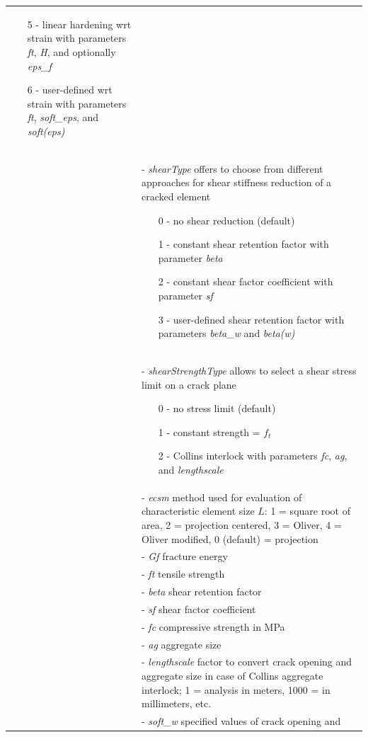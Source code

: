 \documentclass[a4paper]{article}
\newcommand{\param}[1]{{\it #1}}
\begin{document}
\begin{longtable}{|l|p{9cm}|}
\begin{itemize}
\item[5 -] linear hardening wrt strain with parameters \param{ft}, \param{H}, and optionally \param{eps\_f}
\item[6 -] user-defined wrt strain with parameters \param{ft}, \param{soft\_eps}, and \param{soft(eps)}
\end{itemize}\\
&- \param{shearType} offers to choose from different approaches for shear stiffness reduction of a cracked element
\begin{itemize}\setlength{\itemsep}{-3pt}
\item[0 -] no shear reduction (default)
\item[1 -] constant shear retention factor with parameter \param{beta}
\item[2 -] constant shear factor coefficient with parameter \param{sf}
\item[3 -] user-defined shear retention factor with parameters \param{beta\_w} and \param{beta(w)}
\end{itemize}\\
&- \param{shearStrengthType} allows to select a shear stress limit on a crack plane
\begin{itemize}\setlength{\itemsep}{-3pt}
\item[0 -] no stress limit (default)
\item[1 -] constant strength = $f_t$
\item[2 -] Collins interlock with parameters \param{fc}, \param{ag}, and \param{lengthscale}
\end{itemize}\\
&- \param{ecsm} method used for evaluation of characteristic element size $L$: 1 = square root of area, 2 = projection centered, 3 = Oliver, 4 = Oliver modified, 0 (default) = projection \\
&- \param{Gf} fracture energy\\
&- \param{ft} tensile strength\\
&- \param{beta} shear retention factor\\
&- \param{sf} shear factor coefficient\\
&- \param{fc} compressive strength in MPa \\
&- \param{ag} aggregate size \\
&- \param{lengthscale} factor to convert crack opening and aggregate size in case of Collins aggregate interlock; 1 = analysis in meters, 1000 = in millimeters, etc. \\
&- \param{soft\_w} specified values of crack opening and \\

\end{longtable}
\end{document}
